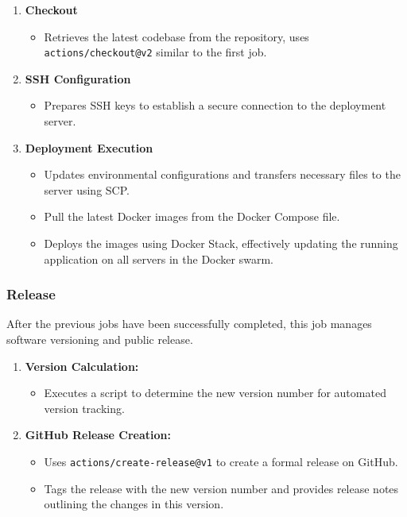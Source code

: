 \documentclass[12pt, a4paper, oneside]{book}
\begin{document}
\begin{enumerate}
    \item \textbf{Checkout} 
    \begin{itemize}
        \item Retrieves the latest codebase from the repository, uses \texttt{actions/checkout@v2} similar to the first job.
    \end{itemize}
    \item \textbf{SSH Configuration} 
    \begin{itemize}
        \item Prepares SSH keys to establish a secure connection to the deployment server.
    \end{itemize}
    
    \item \textbf{Deployment Execution}
    \begin{itemize}
        \item Updates environmental configurations and transfers necessary files to the server using SCP.
        \item Pull the latest Docker images from the Docker Compose file.
        \item Deploys the images using Docker Stack, effectively updating the running application on all servers in the Docker swarm.
    \end{itemize}
\end{enumerate}

 \subsubsection{Release}
 After the previous jobs have been successfully completed, this job manages software versioning and public release.

 \begin{enumerate}
    \item \textbf{Version Calculation:}
    \begin{itemize}
        \item Executes a script to determine the new version number for automated version tracking.
    \end{itemize}
    
    \item \textbf{GitHub Release Creation:}
    \begin{itemize}
        \item Uses \texttt{actions/create-release@v1} to create a formal release on GitHub.
        \item Tags the release with the new version number and provides release notes outlining the changes in this version.
    \end{itemize}
\end{enumerate}
\end{document}

